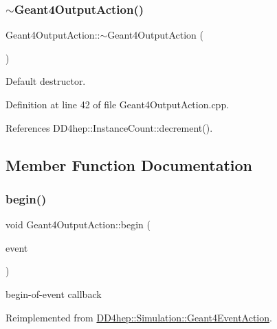 \subsubsection{\texorpdfstring{$\sim$\+Geant4\+Output\+Action()}{~Geant4OutputAction()}}
{\footnotesize\ttfamily Geant4\+Output\+Action\+::$\sim$\+Geant4\+Output\+Action (\begin{DoxyParamCaption}{ }\end{DoxyParamCaption})\hspace{0.3cm}{\ttfamily [virtual]}}



Default destructor. 



Definition at line 42 of file Geant4\+Output\+Action.\+cpp.



References D\+D4hep\+::\+Instance\+Count\+::decrement().



\subsection{Member Function Documentation}
\hypertarget{class_d_d4hep_1_1_simulation_1_1_geant4_output_action_afaad36616c890ac39e80421d340efd47}{}\label{class_d_d4hep_1_1_simulation_1_1_geant4_output_action_afaad36616c890ac39e80421d340efd47} 
\subsubsection{\texorpdfstring{begin()}{begin()}}
{\footnotesize\ttfamily void Geant4\+Output\+Action\+::begin (\begin{DoxyParamCaption}\item[{const G4\+Event $\ast$}]{event }\end{DoxyParamCaption})\hspace{0.3cm}{\ttfamily [virtual]}}



begin-\/of-\/event callback 



Reimplemented from \hyperlink{class_d_d4hep_1_1_simulation_1_1_geant4_event_action_ad10785d157fa962f4ef2a5361bb0f5da}{D\+D4hep\+::\+Simulation\+::\+Geant4\+Event\+Action}.



